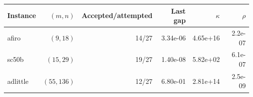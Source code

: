 \begin{tabular}{lrrrrr}
\toprule
Instance & $(m,n)$ & Accepted/attempted & Last gap & $\kappa$ & $\rho$\\
\midrule
afiro & $(9,18)$ & 14/27 & 3.34e-06 & 4.65e+16 & 2.2e-07 \\
sc50b & $(15,29)$ & 19/27 & 1.40e-08 & 5.82e+02 & 6.1e-07 \\
adlittle & $(55,136)$ & 12/27 & 6.80e-01 & 2.81e+14 & 2.5e-09 \\
\bottomrule
\end{tabular}

